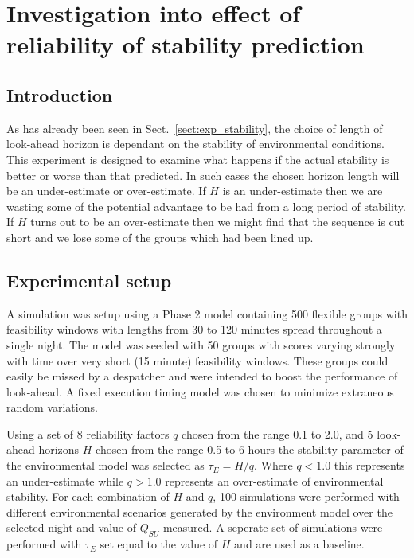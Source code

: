 \section{Investigation into effect of reliability of stability prediction}
\label{sect:exp_reliability}

\subsection{Introduction} 
As has already been seen in Sect.~\ref{sect:exp_stability}, the choice of length of look-ahead horizon is dependant on the stability of environmental conditions. This experiment is designed to examine what happens if the actual stability is better or worse than that predicted. In such cases the chosen horizon length will be an under-estimate or over-estimate. If $H$ is an under-estimate then we are wasting some of the potential advantage to be had from a long period of stability. If $H$ turns out to be an over-estimate then we might find that the sequence is cut short and we lose some of the groups which had been lined up.

\subsection{Experimental setup}
A simulation was setup using a Phase 2 model containing 500 flexible groups with feasibility windows with lengths from 30 to 120 minutes spread throughout a single night. The model was seeded with 50 groups with scores varying strongly with time over very short (15 minute) feasibility windows. These groups could easily be missed by a despatcher and were intended to boost the performance of look-ahead. A fixed execution timing model was chosen to minimize extraneous random variations.

Using a set of 8 reliability factors $q$ chosen from the range 0.1 to 2.0, and 5 look-ahead horizons $H$ chosen from the range 0.5 to 6 hours the stability parameter of the environmental model was selected as $\tau_E=H/q$. Where $q<1.0$ this represents an under-estimate while $q>1.0$ represents an over-estimate of environmental stability. For each combination of $H$ and $q$, 100 simulations were performed with different environmental scenarios generated by the environment model over the selected night and value of $Q_{SU}$ measured. A seperate set of simulations were performed with $\tau_E$ set equal to the value of $H$ and are used as a baseline.

